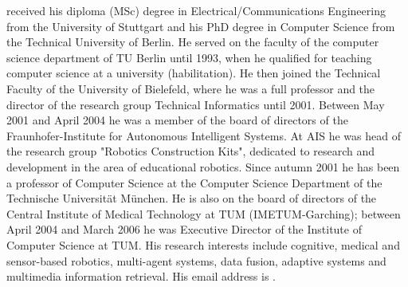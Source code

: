 \documentclass{wscpaperproc}
\theoremstyle{wsc}
\begin{document}
 received his diploma (MSc) degree in Electrical/Communications Engineering from the University of Stuttgart and his PhD degree in Computer Science from the Technical University of Berlin. He served on the faculty of the computer science department of TU Berlin until 1993, when he qualified for teaching computer science at a university (habilitation). He then joined the Technical Faculty of the University of Bielefeld, where he was a full professor and the director of the research group Technical Informatics until 2001. Between May 2001 and April 2004 he was a member of the board of directors of the Fraunhofer-Institute for Autonomous Intelligent Systems. At AIS he was head of the research group "Robotics Construction Kits", dedicated to research and development in the area of educational robotics. Since autumn 2001 he has been a professor of Computer Science at the Computer Science Department
of the Technische Universit\"at M\"unchen. He is also on the board of directors of the Central Institute of Medical Technology at TUM (IMETUM-Garching); between April 2004 and March 2006 he was Executive Director of the Institute of Computer Science at TUM. His research interests include cognitive, medical
and sensor-based robotics, multi-agent systems, data fusion, adaptive systems and multimedia information retrieval. His email address is .
\end{document}
